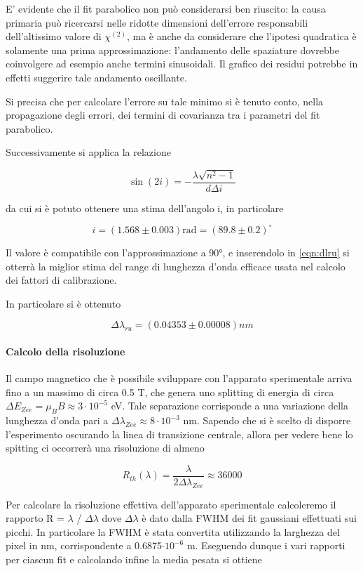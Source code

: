 \documentclass{article}
\begin{document}
	E' evidente che il fit parabolico non può considerarsi ben riuscito: la causa primaria
	può ricercarsi nelle ridotte dimensioni dell'errore responsabili dell'altissimo valore
	di $\chi^{(2)}$, ma è anche da considerare che l'ipotesi quadratica è solamente una 
	prima approssimazione: l'andamento delle spaziature dovrebbe coinvolgere ad esempio 
	anche termini sinusoidali. Il grafico dei residui potrebbe in effetti suggerire tale 
	andamento oscillante.
	

	Si precisa che per calcolare l'errore su tale 
	minimo si è tenuto conto, nella propagazione degli errori, dei termini di 
	covarianza tra i parametri del fit parabolico.
	
	Successivamente si applica la relazione

	\begin{equation}
		\sin(2i) = - \frac{\lambda \sqrt{n^2-1}}{d \Delta i}
	\end{equation}

	da cui si è potuto ottenere una stima dell'angolo i, in particolare

	\[
		i = (1.568 \pm 0.003)\text{rad} = ( 89.8 \pm 0.2 ) ^{\circ}
	\]

	Il valore è compatibile con l'approssimazione a 90°, e inserendolo in \ref{eqn:dlru}
	si otterrà la miglior stima del range di lunghezza d'onda efficace usata
	nel calcolo dei fattori di calibrazione.

	In particolare si è ottenuto

	\[
		\Delta\lambda_{ru} = (0.04353 \pm 0.00008) nm 
	\]	


	\paragraph{Calcolo della risoluzione}

	Il campo magnetico che è possibile sviluppare con l'apparato sperimentale
	arriva fino a un massimo di circa 0.5 T, che genera uno splitting
	di energia di circa $\Delta E_{Zee} = \mu_B B \approx 3\cdot 10^{-5}$ eV.
	Tale separazione corrisponde a una variazione della lunghezza d'onda
	pari a $\Delta \lambda_{Zee} \approx 8 \cdot 10^{-3}$ nm. Sapendo che 
	si è scelto di disporre l'esperimento oscurando la linea di transizione
	centrale, allora per vedere bene lo spitting ci occorrerà una risoluzione
	di almeno

	\[
		R_{th}(\lambda) = \frac{\lambda}{2\Delta\lambda_{Zee}}	\approx 36000
	\]

	Per calcolare la risoluzione effettiva dell'apparato sperimentale
	calcoleremo il rapporto R = $\lambda$ / $\Delta\lambda$ dove 
	$\Delta\lambda$ è dato dalla FWHM dei fit gaussiani effettuati sui 
	picchi. In particolare la FWHM è stata convertita utilizzando la 
	larghezza del pixel in nm, corrispondente a 0.6875$\cdot 10^{-6}$ m.
	Eseguendo dunque i vari rapporti per ciascun fit e calcolando infine
	la media pesata si ottiene
\end{document}
